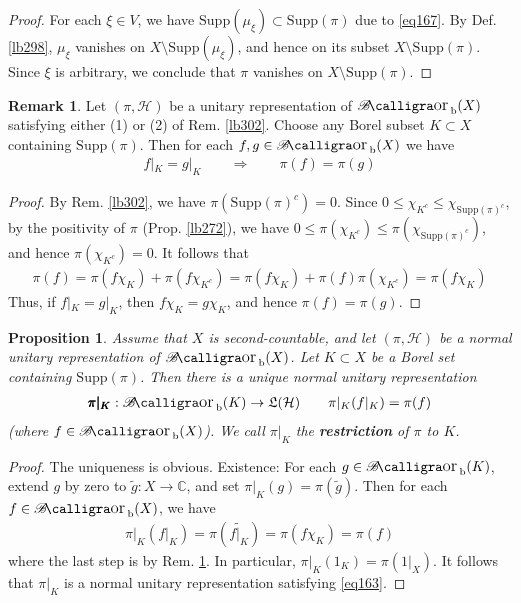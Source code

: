 \documentclass[12pt,b5paper,notitlepage]{article}
\theoremstyle{definition}
\newtheorem{rem}[df]{Remark}
\theoremstyle{plain}
\newtheorem{pp}[df]{Proposition}
\DeclareMathOperator{\Borb}{{\mathscr{B}\text{\kern -2pt {\calligra\large or}}\,}_{\mathrm b}}
\newcommand{\fk}{\mathfrak}
\newcommand{\wtd}{\widetilde}
\newcommand{\Cbb}{\mathbb C}
\newcommand{\Supp}{\mathrm{Supp}}
\newcommand{\MH}{\mathcal H}
\numberwithin{equation}{section}
\begin{document}
\begin{proof}
For each $\xi\in V$, we have $\Supp(\mu_\xi)\subset\Supp(\pi)$ due to \eqref{eq167}. By Def. \ref{lb298}, $\mu_\xi$ vanishes on $X\setminus\Supp(\mu_\xi)$, and hence on its subset $X\setminus\Supp(\pi)$. Since $\xi$ is arbitrary, we conclude that $\pi$ vanishes on $X\setminus\Supp(\pi)$.
\end{proof}


\begin{rem}\label{lb301}
Let $(\pi,\MH)$ be a unitary representation of $\Borb(X)$ satisfying either (1) or (2) of Rem. \ref{lb302}. Choose any Borel subset $K\subset X$ containing $\Supp(\pi)$. Then for each $f,g\in\Borb(X)$ we have
\begin{align*}
f|_K=g|_K\qquad\Longrightarrow\qquad\pi(f)=\pi(g)
\end{align*}
\end{rem}



\begin{proof}
By Rem. \ref{lb302}, we have $\pi(\Supp(\pi)^c)=0$. Since $0\leq \chi_{K^c}\leq\chi_{\Supp(\pi)^c}$, by the positivity of $\pi$ (Prop. \ref{lb272}), we have $0\leq \pi(\chi_{K^c})\leq\pi(\chi_{\Supp(\pi)^c})$, and hence $\pi(\chi_{K^c})=0$. It follows that
\begin{align*}
\pi(f)=\pi(f\chi_K)+\pi(f\chi_{K^c})=\pi(f\chi_K)+\pi(f)\pi(\chi_{K^c})=\pi(f\chi_K)
\end{align*}
Thus, if $f|_K=g|_K$, then $f\chi_K=g\chi_K$, and hence $\pi(f)=\pi(g)$.
\end{proof}

\begin{pp}\label{lb303}
Assume that $X$ is second-countable, and let $(\pi,\MH)$ be a normal unitary representation of $\Borb(X)$. Let $K\subset X$ be a Borel set containing $\Supp(\pi)$. Then there is a unique normal unitary representation
\begin{gather}\label{eq163}
\pmb{\pi|_K}:\Borb(K)\rightarrow\fk L(\MH)\qquad \pi|_K(f|_K)=\pi(f)
\end{gather}
(where $f\in\Borb(X)$). We call $\pi|_K$ the \textbf{restriction}  of $\pi$ to $K$.
\end{pp}

\begin{proof}
The uniqueness is obvious. Existence: For each $g\in\Borb(K)$, extend $g$ by zero to $\wtd g:X\rightarrow\Cbb$, and set $\pi|_K(g)=\pi(\wtd g)$. Then for each $f\in\Borb(X)$, we have
\begin{align*}
\pi|_K(f|_K)=\pi(\wtd{f|_K})=\pi(f\chi_K)=\pi(f)
\end{align*}
where the last step is by Rem. \ref{lb301}. In particular, $\pi|_K(1_K)=\pi(1|_X)$. It follows that $\pi|_K$ is a normal unitary representation satisfying \eqref{eq163}.
\end{proof}
\end{document}

